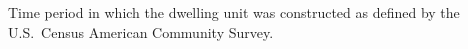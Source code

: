 Time period in which the dwelling unit was constructed as defined by the U.S.~Census American Community Survey.
